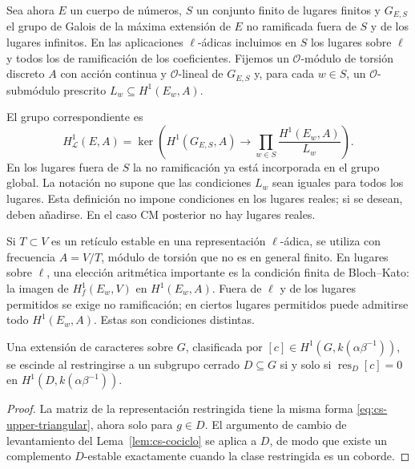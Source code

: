 Sea ahora $E$ un cuerpo de números, $S$ un conjunto finito
de lugares finitos y $G_{E,S}$ el grupo de Galois de la
máxima extensión de $E$ no ramificada fuera de $S$ y de
los lugares infinitos. En las aplicaciones $\ell$-ádicas
incluimos en $S$ los lugares sobre $\ell$ y todos los de
ramificación de los coeficientes. Fijemos un $\mathcal O$-módulo
de torsión discreto $A$ con acción continua y $\mathcal O$-lineal
de $G_{E,S}$ y, para cada $w\in S$, un $\mathcal O$-submódulo
prescrito $L_w\subseteq H^1(E_w,A)$.

\begin{definicion}
\label{def:cs-selmer}
El grupo correspondiente es
\begin{equation}
 H^1_{\mathcal L}(E,A)
 =\ker\!\left(
 H^1(G_{E,S},A)\longrightarrow
 \prod_{w\in S}\frac{H^1(E_w,A)}{L_w}
 \right).
 \label{eq:cs-selmer}
\end{equation}
En los lugares fuera de $S$ la no ramificación ya está
incorporada en el grupo global. La notación no supone que
las condiciones $L_w$ sean iguales para todos los lugares.
Esta definición no impone condiciones en los lugares reales;
si se desean, deben añadirse. En el caso CM posterior no hay
lugares reales.
\end{definicion}

Si $T\subset V$ es un retículo estable en una representación
$\ell$-ádica, se utiliza con frecuencia
$A=V/T$, módulo de torsión que no es en general finito.
En lugares sobre $\ell$, una elección aritmética importante
es la condición finita de Bloch--Kato: la imagen de
$H^1_f(E_w,V)$ en $H^1(E_w,A)$.
Fuera de $\ell$ y de los lugares permitidos se exige
no ramificación; en ciertos lugares permitidos puede
admitirse todo $H^1(E_w,A)$. Estas son condiciones distintas.

\begin{lema}
\label{lem:cs-local-split}
Una extensión de caracteres sobre $G$, clasificada por
$[c]\in H^1(G,k(\alpha\beta^{-1}))$, se escinde al
restringirse a un subgrupo cerrado $D\subseteq G$ si
y solo si
$\operatorname{res}_D[c]=0$ en
$H^1(D,k(\alpha\beta^{-1}))$.
\end{lema}

\begin{proof}
La matriz de la representación restringida tiene la
misma forma \eqref{eq:cs-upper-triangular}, ahora solo
para $g\in D$. El argumento de cambio de levantamiento
del Lema~\ref{lem:cs-cociclo} se aplica a $D$, de modo
que existe un complemento $D$-estable exactamente cuando
la clase restringida es un coborde.
\end{proof}

